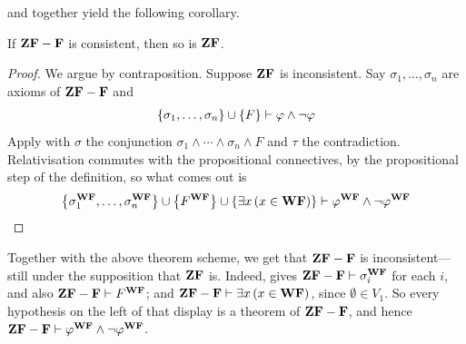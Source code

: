  and  together yield the following corollary.

\begin{boxcorollary} \label{Ch3:Cor:Con_ZF}
    If $\mathbf{ZF} - \mathbf{F}$ is consistent, then so is $\mathbf{ZF}$.
\end{boxcorollary}
\begin{proof}
    We argue by contraposition. Suppose $\mathbf{ZF}$ is inconsistent. Say $\sigma_1, \ldots, \sigma_n$ are axioms of $\mathbf{ZF} - \mathbf{F}$ and
    \begin{align*}
        \left\{ \sigma_1, \ldots, \sigma_n \right\} \cup \left\{ F \right\} \vdash \varphi \land \neg\varphi
    \end{align*}
    Apply  with $\sigma$ the conjunction $\sigma_1 \land \cdots \land \sigma_n \land F$ and $\tau$ the contradiction. Relativisation commutes with the propositional connectives, by the propositional step of the definition, so what comes out is
    \begin{align*}
        \left\{ \sigma_1^{\mathbf{WF}}, \ldots, \sigma_n^{\mathbf{WF}} \right\} \cup \left\{ F^{\mathbf{WF}} \right\} \cup \left\{ \exists x \left( x \in \mathbf{WF} \right) \right\} \vdash \varphi^{\mathbf{WF}} \land \neg \varphi^{\mathbf{WF}}
    \end{align*}
\end{proof}

Together with the above theorem scheme, we get that $\mathbf{ZF} - \mathbf{F}$ is inconsistent---still under the supposition that $\mathbf{ZF}$ is. Indeed,  gives $\mathbf{ZF} - \mathbf{F} \vdash \sigma_i^{\mathbf{WF}}$ for each $i$, and also $\mathbf{ZF} - \mathbf{F} \vdash F^{\mathbf{WF}}$; and $\mathbf{ZF} - \mathbf{F} \vdash \exists x \left( x \in \mathbf{WF} \right)$, since $\emptyset \in V_1$. So every hypothesis on the left of that display is a theorem of $\mathbf{ZF} - \mathbf{F}$, and hence $\mathbf{ZF} - \mathbf{F} \vdash \varphi^{\mathbf{WF}} \land \neg\varphi^{\mathbf{WF}}$.
